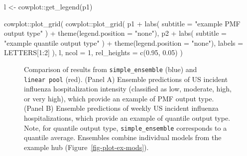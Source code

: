 \documentclass[
]{article}
\newenvironment{Shaded}{\begin{snugshade}}{\end{snugshade}}
\newcommand{\AttributeTok}[1]{\textcolor[rgb]{0.40,0.45,0.13}{#1}}
\newcommand{\DecValTok}[1]{\textcolor[rgb]{0.68,0.00,0.00}{#1}}
\newcommand{\FloatTok}[1]{\textcolor[rgb]{0.68,0.00,0.00}{#1}}
\newcommand{\FunctionTok}[1]{\textcolor[rgb]{0.28,0.35,0.67}{#1}}
\newcommand{\NormalTok}[1]{\textcolor[rgb]{0.00,0.23,0.31}{#1}}
\newcommand{\OtherTok}[1]{\textcolor[rgb]{0.00,0.23,0.31}{#1}}
\newcommand{\SpecialCharTok}[1]{\textcolor[rgb]{0.37,0.37,0.37}{#1}}
\newcommand{\StringTok}[1]{\textcolor[rgb]{0.13,0.47,0.30}{#1}}
\begin{document}
\begin{Shaded}
\begin{Highlighting}[]
\NormalTok{l }\OtherTok{\textless{}{-}}\NormalTok{ cowplot}\SpecialCharTok{::}\FunctionTok{get\_legend}\NormalTok{(p1)}

\NormalTok{cowplot}\SpecialCharTok{::}\FunctionTok{plot\_grid}\NormalTok{(}
\NormalTok{  cowplot}\SpecialCharTok{::}\FunctionTok{plot\_grid}\NormalTok{(}
\NormalTok{    p1 }\SpecialCharTok{+}
      \FunctionTok{labs}\NormalTok{(}
        \AttributeTok{subtitle =}
          \StringTok{"example PMF output type"}
\NormalTok{      ) }\SpecialCharTok{+}
      \FunctionTok{theme}\NormalTok{(}\AttributeTok{legend.position =} \StringTok{"none"}\NormalTok{),}
\NormalTok{    p2 }\SpecialCharTok{+}
      \FunctionTok{labs}\NormalTok{(}
        \AttributeTok{subtitle =}
          \StringTok{"example quantile output type"}
\NormalTok{      ) }\SpecialCharTok{+}
      \FunctionTok{theme}\NormalTok{(}\AttributeTok{legend.position =} \StringTok{"none"}\NormalTok{),}
    \AttributeTok{labels =}\NormalTok{ LETTERS[}\DecValTok{1}\SpecialCharTok{:}\DecValTok{2}\NormalTok{]}
\NormalTok{  ), l,}
  \AttributeTok{ncol =} \DecValTok{1}\NormalTok{,}
  \AttributeTok{rel\_heights =} \FunctionTok{c}\NormalTok{(}\FloatTok{0.95}\NormalTok{, }\FloatTok{0.05}\NormalTok{)}
\NormalTok{)}
\end{Highlighting}
\end{Shaded}

\begin{figure}[H]


\caption{\label{fig-plot-ex-quantile-and-linear-pool}Comparison of
results from \texttt{simple\_ensemble} (blue) and \texttt{linear\ pool}
(red). (Panel A) Ensemble predictions of US incident influenza
hospitalization intensity (classified as low, moderate, high, or very
high), which provide an example of PMF output type. (Panel B) Ensemble
predictions of weekly US incident influenza hospitalizations, which
provide an example of quantile output type. Note, for quantile output
type, \texttt{simple\_ensemble} corresponds to a quantile average.
Ensembles combine individual models from the example hub
(Figure~\ref{fig-plot-ex-mods}).}

\end{figure}%
\end{document}
